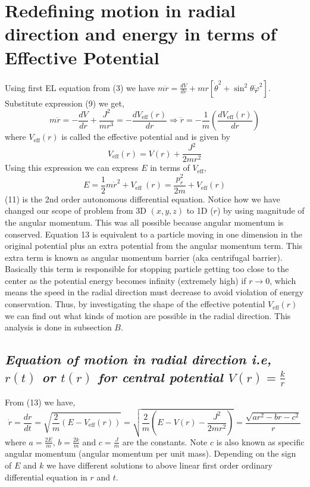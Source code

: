 \documentclass[conference]{IEEEtran}
\begin{document}
\section{\large{\textbf{Redefining motion in radial direction and energy in terms of Effective Potential}}}
 Using first EL equation from (3) we have $m\ddot{r} = \frac{dV}{d r} + mr\left[\dot{\theta}^{2}+\sin ^{2} \theta \dot{\varphi}^{2}\right]$. Substitute expression (9) we get, \begin{equation}m \ddot{r}= -\frac{d V}{d r}+\frac{J^{2}}{mr^{3}}  =  -\frac{d V_{\mathrm{eff}}(r)}{d r} \Rightarrow \ddot{r} = -\frac{1}{m}\left(\frac{d V_{\mathrm{eff}}(r)}{dr}\right)\end{equation} where $V_{\mathrm{eff}}(r)$ is called the effective potential and is given by \begin{equation}V_{\mathrm{eff}}(r)=V(r)+\frac{J^{2}}{2 m r^{2}}\end{equation}Using this expression we can express $E$ in terms of $V_{\mathrm{eff}}$, \begin{equation}
     E=\frac{1}{2} m \dot{r}^{2}+V_{\text {eff }}(r) = \frac{p_{r}^{2}}{2m} + V_{\mathrm{eff}}(r)
 \end{equation}
 (11) is the 2nd order autonomous differential equation. Notice how we have changed our scope of problem from 3D $(x,y,z)$ to 1D ($r$) by using magnitude of the angular momentum.  This was all possible because angular momentum is conserved. Equation 13 is equivalent to a particle moving in one dimension in the original potential plus an extra potential from the angular momentum term. This extra term is known as angular momentum barrier (aka centrifugal barrier). Basically this term is responsible for stopping particle getting too close to the center as the potential energy becomes infinity (extremely high) if $r \to 0$, which means the speed in the radial direction must decrease to avoid violation of energy conservation. Thus, by investigating the shape of the effective potential $V_{\mathrm{eff}}(r)$ we can find out what kinds of motion are possible in the radial direction. This analysis is done in subsection $B$.
\vspace{1em}



\subsection{\normalsize{\emph{\textbf{Equation of motion in radial direction i.e, $r(t)$ or $t(r)$ for central potential $V(r) = \frac{k}{r}$}}}}
From (13) we have, \begin{dmath}\dot{r}=\frac{d r}{d t}= \sqrt{\frac{2}{m}\left(E-V_{\mathrm{eff}}(r)\right)}= \sqrt{\frac{2}{m}\left(E-V(r)-\frac{J^{2}}{2 m r^{2}}\right)} = \frac{\sqrt{ar^{2} - br - c^{2}}}{r}\end{dmath} where $a = \frac{2E}{m}$, $b = \frac{2k}{m}$ and $c = \frac{J}{m}$ are the constants. Note $c$ is also known as specific angular momentum (angular momentum per unit mass). Depending on the sign of $E$ and $k$ we have different solutions to above linear first order ordinary differential equation in $r$ and $t$. 
 \vspace{1em}
 
\end{document}

